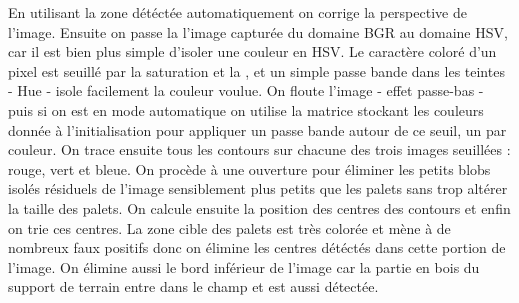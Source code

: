 \documentclass{article}
\begin{document}
En utilisant la zone détéctée automatiquement on corrige la perspective de l'image. Ensuite on passe la l'image capturée du domaine BGR au domaine HSV, car il est bien plus simple d'isoler une couleur en HSV. Le caractère coloré d'un pixel est seuillé par la saturation et la , et un simple passe bande dans les teintes - Hue - isole facilement la couleur voulue. On floute l'image - effet passe-bas - puis si on est en mode automatique on utilise la matrice stockant les couleurs donnée à l'initialisation pour appliquer un passe bande autour de ce seuil, un par couleur. On trace ensuite tous les contours sur chacune des trois images seuillées : rouge, vert et bleue. On procède à une ouverture pour éliminer les petits blobs isolés résiduels de l'image sensiblement plus petits que les palets sans trop altérer la taille des palets. On calcule ensuite la position des centres des contours et enfin on trie ces centres. La zone cible des palets est très colorée et mène à de nombreux faux positifs donc on élimine les centres détéctés dans cette portion de l'image. On élimine aussi le bord inférieur de l'image car la partie en bois du support de terrain entre dans le champ et est aussi détectée.
\end{document}
